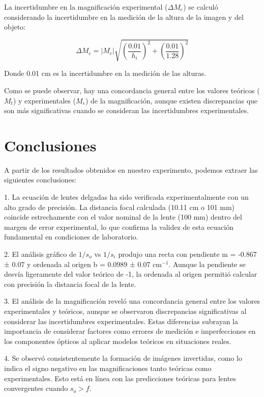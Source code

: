 \documentclass[twocolumn,a4paper,11pt]{scrartcl}
\begin{document}
La incertidumbre en la magnificación experimental ($\Delta M_e$) se calculó considerando la incertidumbre en la medición de la altura de la imagen y del objeto:

\begin{equation}
\Delta M_e = |M_e| \sqrt{(\frac{0.01}{h_i})^2 + (\frac{0.01}{1.28})^2}
\end{equation}

Donde 0.01 cm es la incertidumbre en la medición de las alturas.

Como se puede observar, hay una concordancia general entre los valores teóricos ($M_t$) y experimentales ($M_e$) de la magnificación, aunque existen discrepancias que son más significativas cuando se consideran las incertidumbres experimentales.

\section{Conclusiones}

A partir de los resultados obtenidos en nuestro experimento, podemos extraer las siguientes conclusiones:

1. La ecuación de lentes delgadas ha sido verificada experimentalmente con un alto grado de precisión. La distancia focal calculada (10.11 cm o 101 mm) coincide estrechamente con el valor nominal de la lente (100 mm) dentro del margen de error experimental, lo que confirma la validez de esta ecuación fundamental en condiciones de laboratorio.

2. El análisis gráfico de $1/s_o$ vs $1/s_i$ produjo una recta con pendiente m = -0.867 ± 0.07 y ordenada al origen b = 0.0989 ± 0.07 cm$^{-1}$. Aunque la pendiente se desvía ligeramente del valor teórico de -1, la ordenada al origen permitió calcular con precisión la distancia focal de la lente.


3. El análisis de la magnificación reveló una concordancia general entre los valores experimentales y teóricos, aunque se observaron discrepancias significativas al considerar las incertidumbres experimentales. Estas diferencias subrayan la importancia de considerar factores como errores de medición e imperfecciones en los componentes ópticos al aplicar modelos teóricos en situaciones reales.

4. Se observó consistentemente la formación de imágenes invertidas, como lo indica el signo negativo en las magnificaciones tanto teóricas como experimentales. Esto está en línea con las predicciones teóricas para lentes convergentes cuando $s_o > f$.



\end{document}
